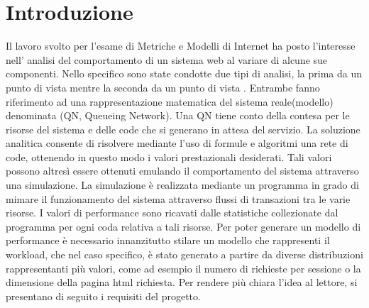\chapter{Introduzione}
Il lavoro svolto per l'esame di Metriche e Modelli di Internet ha posto l'interesse nell' analisi del comportamento di un sistema web al variare di alcune sue componenti. Nello specifico sono state condotte due tipi di analisi, la prima da un punto di vista  mentre la seconda da un punto di vista . Entrambe fanno riferimento ad una 
rappresentazione matematica del sistema reale(modello) denominata (QN, Queueing Network). Una QN tiene conto della contesa per le risorse del sistema e delle code che si generano in attesa del servizio. 
La soluzione analitica consente di risolvere mediante l’uso di formule e algoritmi una rete di code, ottenendo in questo modo i valori prestazionali desiderati. Tali valori possono altresì essere ottenuti emulando il comportamento del sistema attraverso una simulazione. 
La simulazione è realizzata mediante un programma in grado di mimare il funzionamento del sistema attraverso flussi di transazioni tra le varie risorse. I valori di performance sono ricavati dalle statistiche collezionate dal programma per ogni coda relativa a tali risorse. 
Per poter generare un modello di performance è necessario innanzitutto stilare un modello che rappresenti il workload, che nel caso specifico, è stato generato a partire da diverse distribuzioni rappresentanti più valori, come ad esempio il numero di richieste per sessione o la dimensione della pagina html richiesta. 
Per rendere più chiara l'idea al lettore, si presentano di seguito i requisiti del progetto.
